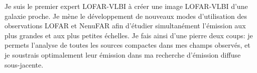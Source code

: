 %
%	

\begin{tcolorbox}[colback=green!10, colframe=green!50!black, arc=3mm, boxrule=1pt]
	Je suis le premier expert LOFAR-VLBI \`a cr\'eer une image LOFAR-VLBI d'une galaxie proche. Je m\`ene le d\'eveloppement de nouveaux modes d'utilisation des observations LOFAR et NenuFAR afin d'\'etudier simultan\'ement l'\'emission aux plus grandes et aux plus petites \'echelles. Je fais ainsi d'une pierre deux coups: je permets l'analyse de toutes les sources compactes dans mes champs observ\'es, et je soustrais optimalement leur \'emission dans ma recherche d'\'emission diffuse sous-jacente.
\end{tcolorbox}



\setlength{\bibsep}{0pt plus 0.3ex}
\begin{multicols}{3}
	\small%
	{
		
		
	}
\end{multicols}


